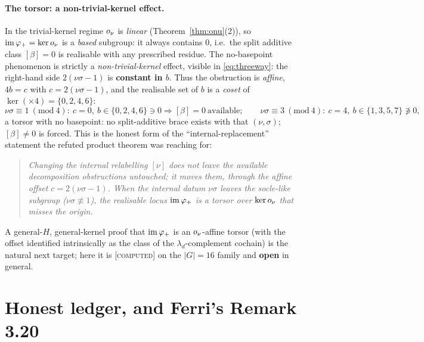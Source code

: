 \paragraph{The torsor: a non-trivial-kernel effect.}
In the trivial-kernel regime $o_\nu$ is \emph{linear} (Theorem~\ref{thm:onu}(2)), so
$\operatorname{im}\varphi_+=\operatorname{ker}o_\nu$ is a \emph{based} subgroup: it always contains $0$, i.e.\ the
split additive class $[\beta]=0$ is realisable with any prescribed residue. The
no-basepoint phenomenon is strictly a \emph{non-trivial-kernel} effect, visible in
\eqref{eq:threeway}: the right-hand side $2(\nu\sigma-1)$ is \textbf{constant in
$b$}. Thus the obstruction is \emph{affine}, $4b=c$ with $c=2(\nu\sigma-1)$, and the
realisable set of $b$ is a \emph{coset} of $\ker(\times4)=\{0,2,4,6\}$:
\[
   \nu\sigma\equiv1\ (\mathrm{mod}\ 4):\ c=0,\ b\in\{0,2,4,6\}\ni0\Rightarrow[\beta]=0\ \text{available};\qquad
   \nu\sigma\equiv3\ (\mathrm{mod}\ 4):\ c=4,\ b\in\{1,3,5,7\}\not\ni0,
\]
a torsor with no basepoint: no split-additive brace exists with that $(\nu,\sigma)$;
$[\beta]\neq0$ is forced. This is the honest form of the ``internal-replacement''
statement the refuted product theorem was reaching for:

\begin{quote}\itshape
Changing the internal relabelling $[\nu]$ does not leave the available
decomposition obstructions untouched; it \emph{moves} them, through the affine
offset $c=2(\nu\sigma-1)$. When the internal datum $\nu\sigma$ leaves the
socle-like subgroup ($\nu\sigma\not\equiv1$), the realisable locus $\operatorname{im}\varphi_+$
is a torsor over $\operatorname{ker}o_\nu$ that misses the origin.
\end{quote}

\noindent A general-$H$, general-kernel proof that $\operatorname{im}\varphi_+$ is an
$o_\nu$-affine torsor (with the offset identified intrinsically as the class of the
$\lambda_d$-complement cochain) is the natural next target; here it is
\textsc{[computed]} on the $|G|=16$ family and \textbf{open} in general.

\section{Honest ledger, and Ferri's Remark 3.20}\label{sec:omega-ledger}

